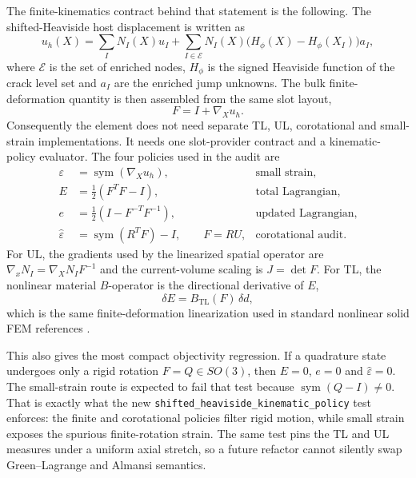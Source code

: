 The finite-kinematics contract behind that statement is the following.  The
shifted-Heaviside host displacement is written as
\begin{equation}
  u_h(X)=
  \sum_I N_I(X) u_I
  + \sum_{I\in\mathcal{E}}
    N_I(X)\bigl(H_\phi(X)-H_\phi(X_I)\bigr)a_I ,
  \label{eq:validation-xfem-shifted-heaviside-displacement}
\end{equation}
where \(\mathcal{E}\) is the set of enriched nodes, \(H_\phi\) is the signed
Heaviside function of the crack level set and \(a_I\) are the enriched jump
unknowns.  The bulk finite-deformation quantity is then assembled from the
same slot layout,
\begin{equation}
  F = I + \nabla_X u_h .
  \label{eq:validation-xfem-f-from-shifted-heaviside}
\end{equation}
Consequently the element does not need separate TL, UL, corotational and
small-strain implementations.  It needs one slot-provider contract and a
kinematic-policy evaluator.  The four policies used in the audit are
\begin{align}
  \varepsilon
    &= \operatorname{sym}(\nabla_X u_h),
  &\text{small strain},\\
  E
    &= \frac{1}{2}\left(F^T F-I\right),
  &\text{total Lagrangian},\\
  e
    &= \frac{1}{2}\left(I-F^{-T}F^{-1}\right),
  &\text{updated Lagrangian},\\
  \hat{\varepsilon}
    &= \operatorname{sym}(R^T F)-I,\qquad F=RU,
  &\text{corotational audit}.
\end{align}
For UL, the gradients used by the linearized spatial operator are
\(\nabla_x N_I=\nabla_X N_I F^{-1}\) and the current-volume scaling is
\(J=\det F\).  For TL, the nonlinear material \(B\)-operator is the directional
derivative of \(E\),
\begin{equation}
  \delta E = B_{\mathrm{TL}}(F)\,\delta d ,
\end{equation}
which is the same finite-deformation linearization used in standard nonlinear
solid FEM references
\cite{BonetWood2008,Crisfield1991_NLFEA_Vol1,Crisfield1997_Vol2,Belytschko2014_NonlinearFEM,MarsdenHughes1994_MathematicalFoundationsOfElasticity}.

This also gives the most compact objectivity regression.  If a quadrature
state undergoes only a rigid rotation \(F=Q\in SO(3)\), then
\(E=0\), \(e=0\) and \(\hat{\varepsilon}=0\).  The small-strain route is
expected to fail that test because
\(\operatorname{sym}(Q-I)\neq0\).  That is exactly what the new
\texttt{shifted\_heaviside\_kinematic\_policy} test enforces: the finite and
corotational policies filter rigid motion, while small strain exposes the
spurious finite-rotation strain.  The same test pins the TL and UL measures
under a uniform axial stretch, so a future refactor cannot silently swap
Green--Lagrange and Almansi semantics.

